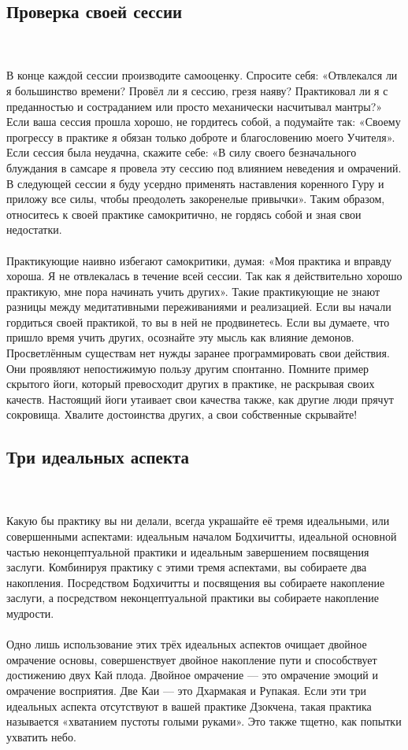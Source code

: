 \subsection{Проверка своей сессии}
\\ \\ В конце каждой сессии производите самооценку. Спросите себя: «Отвлекался ли я большинство времени? Провёл ли я сессию, грезя наяву? Практиковал ли я с преданностью и состраданием или просто механически насчитывал мантры?» Если ваша сессия прошла хорошо, не гордитесь собой, а подумайте так: «Своему прогрессу в практике я обязан только доброте и благословению моего Учителя». Если сессия была неудачна, скажите себе: «В силу своего безначального блуждания в самсаре я провела эту сессию под влиянием неведения и омрачений. В следующей сессии я буду усердно применять наставления коренного Гуру и приложу все силы, чтобы преодолеть закоренелые привычки». Таким образом, относитесь к своей практике самокритично, не гордясь собой и зная свои недостатки.
\\ \\ Практикующие наивно избегают самокритики, думая: «Моя практика и вправду хороша. Я не отвлекалась в течение всей сессии. Так как я действительно хорошо практикую, мне пора начинать учить других». Такие практикующие не знают разницы между медитативными переживаниями и реализацией. Если вы начали гордиться своей практикой, то вы в ней не продвинетесь. Если вы думаете, что пришло время учить других, осознайте эту мысль как влияние демонов. Просветлённым существам нет нужды заранее программировать свои действия. Они проявляют непостижимую пользу другим спонтанно. Помните пример скрытого йоги, который превосходит других в практике, не раскрывая своих качеств. Настоящий йоги утаивает свои качества также, как другие люди прячут сокровища. Хвалите достоинства других, а свои собственные скрывайте!
\subsection{Три идеальных аспекта}
\\ \\ Какую бы практику вы ни делали, всегда украшайте её тремя идеальными, или совершенными аспектами: идеальным началом Бодхичитты, идеальной основной частью неконцептуальной практики и идеальным завершением посвящения заслуги. Комбинируя практику с этими тремя аспектами, вы собираете два накопления. Посредством Бодхичитты и посвящения вы собираете накопление заслуги, а посредством неконцептуальной практики вы собираете накопление мудрости.
\\ \\ Одно лишь использование этих трёх идеальных аспектов очищает двойное омрачение основы, совершенствует двойное накопление пути и способствует достижению двух Кай плода. Двойное омрачение — это омрачение эмоций и омрачение восприятия. Две Каи — это Дхармакая и Рупакая. Если эти три идеальных аспекта отсутствуют в вашей практике Дзокчена, такая практика называется «хватанием пустоты голыми руками». Это также тщетно, как попытки ухватить небо.
